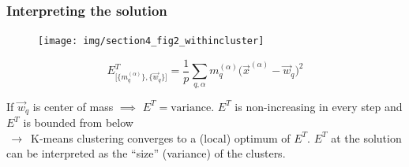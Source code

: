 \begin{frame} \frametitle{Interpreting the solution}
\begin{figure}[h]
\texttt{[image: img/section4\_fig2\_withincluster]}
\end{figure}
$$
	E_{ \big[ \big\{ m_q^{(\alpha)} \big\}, \big\{ \vec{w}_q \big\} 
		\big] }^T = \frac{1}{p} \sum\limits_{q,\alpha} m_q^{(\alpha)}
		\big( \vec{x}^{(\alpha)} - \vec{w}_q \big)^2
$$
\begin{itemize}
 \itR If $\vec{w}_q$ is center of mass $\implies$ $E^T = \mathrm{variance}$.
 \itR $E^T$ is non-increasing in every step and $E^T$ is bounded from below \\ $\,\to\,$ K-means clustering converges to a (local) optimum of $E^T$. 
\itR $E^T$ at the solution can be interpreted as the ``size'' (variance) of the clusters.
\end{itemize} 
\end{frame}

